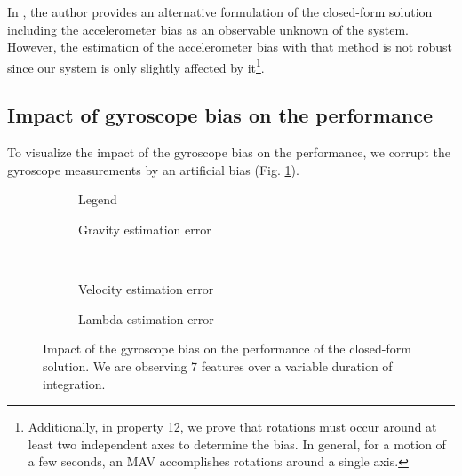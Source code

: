 \documentclass[letterpaper, 10 pt, journal, twoside]{IEEEtran}  %
\begin{document}
In \cite{Martinelli2014}, the author provides an alternative formulation of the closed-form solution including the accelerometer bias as an observable unknown of the system.
However, the estimation of the accelerometer bias with that method is not robust since our system is only slightly affected by it\footnote{Additionally, in \cite{Martinelli2014} property 12, we prove that rotations must occur around at least two independent axes to determine the bias. In general, for a motion of a few seconds, an MAV accomplishes rotations around a single axis.}.




\subsection{Impact of gyroscope bias on the performance}
To visualize the impact of the gyroscope bias on the performance,
we corrupt the gyroscope measurements by an artificial bias (Fig. \ref{fig:biasGyroCF}).


\begin{figure}[h!]
  \centering
        \hspace{0.2\columnwidth}%
        \begin{subfigure}[b]{0.3\columnwidth}
                \resizebox{\columnwidth}{!}{}
                \caption{Legend}

        \end{subfigure}%
        \begin{subfigure}[b]{0.5\columnwidth}
                \resizebox{\columnwidth}{!}{}
                \caption{Gravity estimation error}

        \end{subfigure}
        ~
        \begin{subfigure}[b]{0.5\columnwidth}
                \resizebox{\columnwidth}{!}{}
                \caption{Velocity estimation error}

        \end{subfigure}%
        \begin{subfigure}[b]{0.5\columnwidth}
                \resizebox{\columnwidth}{!}{}
                \caption{Lambda estimation error}

        \end{subfigure}
        \caption{Impact of the gyroscope bias on the performance of the closed-form solution. We are observing 7 features over a variable duration of integration. \label{fig:biasGyroCF}}
\end{figure}
\end{document}
